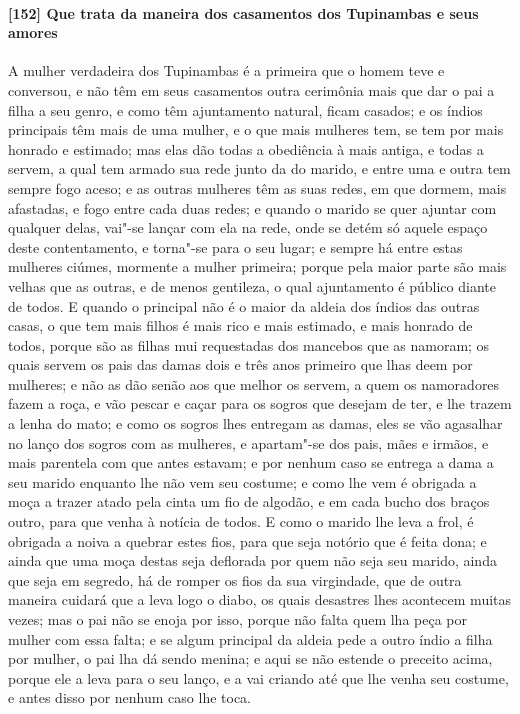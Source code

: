 \paragraph{[152] Que trata da maneira dos casamentos dos Tupinambas e seus amores}\quad
A mulher verdadeira dos Tupinambas é a primeira que o homem teve e conversou, e não têm em
seus casamentos outra cerimônia mais que dar o pai a filha a seu genro, e como têm
ajuntamento natural, ficam casados; e os índios principais têm mais de uma mulher, e o que
mais mulheres tem, se tem por mais honrado e estimado; mas elas dão todas a obediência à
mais antiga, e todas a servem, a qual tem armado sua rede junto da do marido, e entre uma
e outra tem sempre fogo aceso; e as outras mulheres têm as suas redes, em que dormem, mais
afastadas, e fogo entre cada duas redes; e quando o marido se quer ajuntar com qualquer
delas, vai"-se lançar com ela na rede, onde se detém só aquele espaço deste contentamento,
e torna"-se para o seu lugar; e sempre há entre estas mulheres ciúmes, mormente a mulher
primeira; porque pela maior parte são mais velhas que as outras, e de menos gentileza, o
qual ajuntamento é público diante de todos. E quando o principal não é o maior da aldeia
dos índios das outras casas, o que tem mais filhos é mais rico e mais estimado, e mais
honrado de todos, porque são as filhas mui requestadas dos mancebos que as namoram; os
quais servem os pais das damas dois e três anos primeiro que lhas deem por mulheres; e não
as dão senão aos que melhor os servem, a quem os namoradores fazem a roça, e vão pescar e
caçar para os sogros que desejam de ter, e lhe trazem a lenha do mato; e como os sogros
lhes entregam as damas, eles se vão agasalhar no lanço dos sogros com as mulheres, e
apartam"-se dos pais, mães e irmãos, e mais parentela com que antes estavam; e por nenhum
caso se entrega a dama a seu marido enquanto lhe não vem seu costume; e como lhe vem é
obrigada a moça a trazer atado pela cinta um fio de algodão, e em cada bucho dos braços
outro, para que venha à notícia de todos. E como o marido lhe leva a frol, é obrigada a
noiva a quebrar estes fios, para que seja notório que é feita dona; e ainda que uma moça
destas seja deflorada por quem não seja seu marido, ainda que seja em segredo, há de
romper os fios da sua virgindade, que de outra maneira cuidará que a leva logo o diabo, os
quais desastres lhes acontecem muitas vezes; mas o pai não se enoja por isso, porque não
falta quem lha peça por mulher com essa falta; e se algum principal da aldeia pede a outro
índio a filha por mulher, o pai lha dá sendo menina; e aqui se não estende o preceito
acima, porque ele a leva para o seu lanço, e a vai criando até que lhe venha seu costume,
e antes disso por nenhum caso lhe toca.

